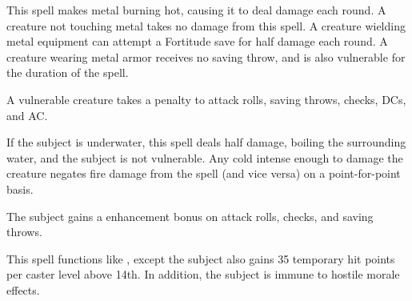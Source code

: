 \spellrng{\rngmed}
\begin{spelleffect}
  This spell makes metal burning hot, causing it to deal damage each round. A creature not touching metal takes no damage from this spell. A creature wielding metal equipment can attempt a Fortitude save for half damage each round. A creature wearing metal armor receives no saving throw, and is also vulnerable for the duration of the spell.
\end{spelleffect}
\begin{spellnotes}
A vulnerable creature takes a  penalty to attack rolls, saving throws, checks, DCs, and AC.

  If the subject is underwater, this spell deals half damage, boiling the surrounding water, and the subject is not vulnerable. Any cold intense enough to damage the creature negates fire damage from the spell (and vice versa) on a point-for-point basis.
\end{spellnotes}

\spellrng{\rngclose}
\begin{spelleffect}
  The subject gains a  enhancement bonus on attack rolls, checks, and saving throws. \bonusscalingdescription
\end{spelleffect}

\begin{spelleffect}
  This spell functions like , except the subject also gains 35 temporary hit points  per caster level above 14th. In addition, the subject is immune to hostile morale effects.
\end{spelleffect}

